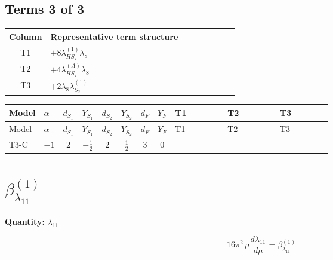 \documentclass[8pt]{article}
\begin{document}
\begin{landscape}
\subsection*{Terms 3 of 3}
\begin{center}
\begin{tabular}{@{}c >{\raggedright\arraybackslash}p{0.82\linewidth}@{}}
\toprule
Column & Representative term structure \\
\midrule
T1 & \(\displaystyle +8 {\lambda_{HS_2}^{(1)}} {\lambda_{8}}\) \\
\midrule
T2 & \(\displaystyle +4 {\lambda_{HS_2}^{(A)}} {\lambda_{8}}\) \\
\midrule
T3 & \(\displaystyle +2 {\lambda_{8}} {\lambda_{S_2}^{(1)}}\) \\
\midrule
\bottomrule
\end{tabular}
\end{center}
\smallskip
\tiny
\begin{longtable}{@{}llcccccc >{\raggedright\arraybackslash}p{0.21\linewidth} >{\raggedright\arraybackslash}p{0.21\linewidth} >{\raggedright\arraybackslash}p{0.21\linewidth}@{}}
\toprule
Model & $\alpha$ & $d_{S_1}$ & $Y_{S_1}$ & $d_{S_2}$ & $Y_{S_2}$ & $d_F$ & $Y_F$ & T1 & T2 & T3 \\
\midrule
\endfirsthead
\toprule
Model & $\alpha$ & $d_{S_1}$ & $Y_{S_1}$ & $d_{S_2}$ & $Y_{S_2}$ & $d_F$ & $Y_F$ & T1 & T2 & T3 \\
\midrule
\endhead
T3-C & $-1$ & $2$ & $-\frac{1}{2}$ & $2$ & $\frac{1}{2}$ & $3$ & $0$ & \scriptsize\adjustbox{max width=\linewidth}{$\begin{gathered} +8 {\lambda_{HS_2}^{(1)}} {\lambda_{8}}\end{gathered}$} & \scriptsize\adjustbox{max width=\linewidth}{$\begin{gathered} +4 {\lambda_{HS_2}^{(A)}} {\lambda_{8}}\end{gathered}$} & \scriptsize\adjustbox{max width=\linewidth}{$\begin{gathered} +2 {\lambda_{8}} {\lambda_{S_2}^{(1)}}\end{gathered}$} \\
\midrule
\bottomrule
\end{longtable}
\clearpage
\section*{$\beta_{\lambda_{11}}^{(1)}$}
\noindent\textbf{Quantity: }$\lambda_{11}$\par\smallskip
\[16\pi^2\,\mu\frac{d \lambda_{11}}{d\mu}=\beta_{\lambda_{11}}^{(1)}\]

\end{landscape}
\end{document}
